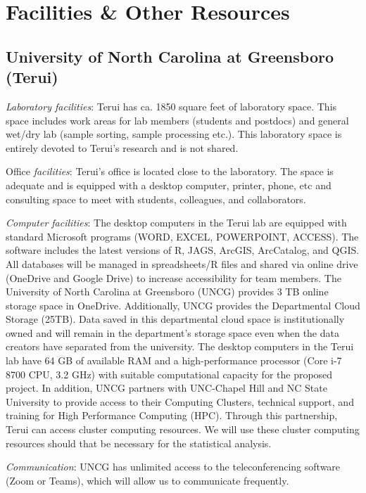 \documentclass[12pt, class=article, crop=false]{standalone}
\begin{document}
\section*{Facilities \& Other Resources}

\subsection*{University of North Carolina at Greensboro (Terui)}

\textit{Laboratory facilities}: Terui has ca. 1850 square feet of laboratory space.
This space includes work areas for lab members (students and postdocs) and general wet/dry lab (sample sorting, sample processing etc.).
This laboratory space is entirely devoted to Terui's research and is not shared.

Office \textit{facilities}: Terui's office is located close to the laboratory.
The space is adequate and is equipped with a desktop computer, printer, phone, etc and consulting space to meet with students, colleagues, and collaborators.

\textit{Computer facilities}: The desktop computers in the Terui lab are equipped with standard Microsoft programs
(WORD, EXCEL, POWERPOINT, ACCESS).
The software includes the latest versions of R, JAGS, ArcGIS, ArcCatalog, and QGIS.
All databases will be managed in spreadsheets/R files and shared via online drive (OneDrive and Google Drive) to increase accessibility for team members.
The University of North Carolina at Greensboro (UNCG) provides 3 TB online storage space in OneDrive.
Additionally, UNCG provides the Departmental Cloud Storage (25TB).
Data saved in this departmental cloud space is institutionally owned and will remain in the department’s storage space even when the data creators have separated from the university.
The desktop computers in the Terui lab have 64 GB of available RAM and a high-performance processor (Core i-7 8700 CPU, 3.2 GHz) with suitable computational capacity for the proposed project.
In addition, UNCG partners with UNC-Chapel Hill and NC State University to provide access to their Computing Clusters, technical support, and training for High Performance Computing (HPC).
Through this partnership, Terui can access cluster computing resources.
We will use these cluster computing resources should that be necessary for the statistical analysis.

\textit{Communication}: UNCG has unlimited access to the teleconferencing software (Zoom or Teams), which will allow us to communicate frequently.
\end{document}
